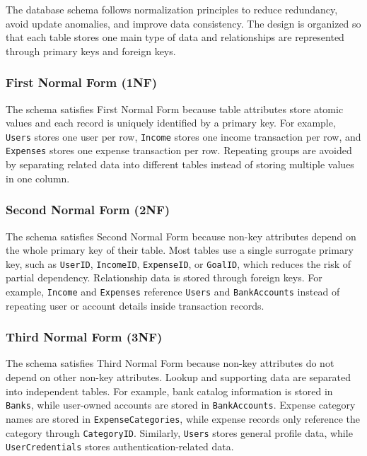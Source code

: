 ﻿\documentclass{article}
\begin{document}
The database schema follows normalization principles to reduce redundancy, avoid update anomalies, and improve data consistency. The design is organized so that each table stores one main type of data and relationships are represented through primary keys and foreign keys.

\subsubsection{First Normal Form (1NF)}

The schema satisfies First Normal Form because table attributes store atomic values and each record is uniquely identified by a primary key. For example, \texttt{Users} stores one user per row, \texttt{Income} stores one income transaction per row, and \texttt{Expenses} stores one expense transaction per row. Repeating groups are avoided by separating related data into different tables instead of storing multiple values in one column.

\subsubsection{Second Normal Form (2NF)}

The schema satisfies Second Normal Form because non-key attributes depend on the whole primary key of their table. Most tables use a single surrogate primary key, such as \texttt{UserID}, \texttt{IncomeID}, \texttt{ExpenseID}, or \texttt{GoalID}, which reduces the risk of partial dependency. Relationship data is stored through foreign keys. For example, \texttt{Income} and \texttt{Expenses} reference \texttt{Users} and \texttt{BankAccounts} instead of repeating user or account details inside transaction records.

\subsubsection{Third Normal Form (3NF)}

The schema satisfies Third Normal Form because non-key attributes do not depend on other non-key attributes. Lookup and supporting data are separated into independent tables. For example, bank catalog information is stored in \texttt{Banks}, while user-owned accounts are stored in \texttt{BankAccounts}. Expense category names are stored in \texttt{ExpenseCategories}, while expense records only reference the category through \texttt{CategoryID}. Similarly, \texttt{Users} stores general profile data, while \texttt{UserCredentials} stores authentication-related data.
\end{document}
